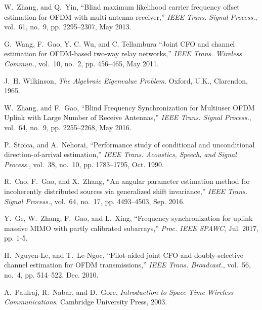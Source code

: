 \documentclass[12pt, draftclsnofoot, onecolumn]{IEEEtran}
\begin{document}
\begin{thebibliography}{99}
W.~Zhang, and Q.~Yin, ``Blind maximum likelihood carrier frequency offset
estimation for OFDM with multi-antenna receiver,'' \emph{IEEE Trans.
Signal Process.}, vol.~61, no.~9, pp. 2295--2307, May 2013.

G.~Wang, F.~Gao, Y. C. Wu, and C. Tellambura ``Joint CFO and channel
estimation for OFDM-based two-way relay networks,'' \emph{IEEE Trans.
Wireless Commun.}, vol.~10, no.~2, pp. 456--465, May 2011.

J.~H. Wilkinson, \emph{The Algebraic Eigenvalue Problem}. Oxford, U.K., Clarendon, 1965.

W.~Zhang, and F.~Gao, ``Blind Frequency Synchronization for Multiuser
OFDM Uplink with Large Number of Receive Antennas,'' \emph{IEEE Trans.
Signal Process.}, vol.~64, no.~9, pp. 2255--2268, May 2016.

P.~Stoica, and A.~Nehorai, ``Performance study of conditional and unconditional direction-of-arrival estimation,'' \emph{IEEE Trans. Acoustics, Speech, and Signal Process.}, vol.~38, no.~10, pp. 1783--1795, Oct. 1990.

R.~Cao, F.~Gao, and X.~Zhang, ``An angular parameter estimation method for incoherently distributed sources via generalized shift invariance,'' \emph{IEEE Trans. Signal Process.}, vol.~64, no.~17, pp. 4493--4503, Sep. 2016.

Y.~Ge, W.~Zhang, F.~Gao, and L.~Xing, ``Frequency synchronization for uplink massive MIMO with partly calibrated subarrays,'' \emph{Proc. IEEE SPAWC}, Jul. 2017, pp. 1-5.

H.~Nguyen-Le, and T.~Le-Ngoc, ``Pilot-aided joint CFO and doubly-selective channel estimation for OFDM transmissions,'' \emph{IEEE Trans. Broadcast.}, vol.~56, no.~4, pp. 514--522, Dec. 2010.

A.~Paulraj, R.~Nabar, and D.~Gore, \emph{Introduction to Space-Time Wireless
Communications}. Cambridge University Press, 2003.

\end{thebibliography}
\end{document}
